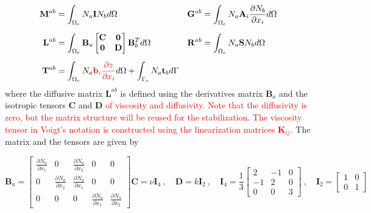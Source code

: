 \documentclass[a4paper,12pt]{elsarticle}
\newcommand{\Miguel}[1]{\textcolor{red}{#1}}
\newcommand{\pder}[2]{\frac{\partial#1}{\partial#2}}
\begin{document}
\begin{align} \label{discrete_sw_matrices}
    \displaystyle \mathbf{M}^{ab} &= \int_{\Omega_e}N_a \mathbf{I} N_b d\Omega &
    \displaystyle \mathbf{G}^{ab} &= \int_{\Omega_e}
        N_a \mathbf{A}_i \pder{N_b}{x_i} d\Omega \nonumber\\[5pt]
    \displaystyle \mathbf{L}^{ab} &= \int_{\Omega_e}
        \mathbf{B}_a \left[\begin{matrix}
            \mathbf{C} & \mathbf{0} \\ \mathbf{0} & \mathbf{D}
        \end{matrix}\right] \mathbf{B}_b^T d\Omega &
    \displaystyle \mathbf{R}^{ab} &= \int_{\Omega_e} N_a \mathbf{S} N_b d\Omega \\[5pt]
    \displaystyle \mathbf{T}^{ab} &= \int_{\Omega_e} N_a \Miguel{\mathbf{b}_i \pder{z}{x_i}} d\Omega +
        \int_{\Gamma_e} N_a \mathbf{t}_b d\Gamma \nonumber
\end{align}
where the diffusive matrix $\mathbf{L}^{ab}$ is defined using the derivatives matrix $\mathbf{B}_a$ and the isotropic tensors $\mathbf{C}$ and $\mathbf{D}$ \Miguel{of viscosity and diffusivity. Note that the diffusivity is zero, but the matrix structure will be reused for the stabilization. The viscosity tensor in Voigt's notation is constructed using the linearization matrices $\mathbf{K}_{ij}$.}
The matrix and the tensors are given by

\begin{subequations}
\begin{equation}
\mathbf{B}_a = \left[\begin{matrix}
    \pder{N_a}{x_1} & 0 & \pder{N_a}{x_2} & 0 & 0 \\
    0 & \pder{N_a}{x_2} & \pder{N_a}{x_1} & 0 & 0 \\
    0 & 0 & 0 & \pder{N_a}{x_1} & \pder{N_a}{x_2}
\end{matrix}\right]
\end{equation}
\begin{equation}
\mathbf{C} = \nu \mathbf{I}_4 \ , \quad
\mathbf{D} = k \mathbf{I}_2 \ , \quad
\mathbf{I}_4 = \frac{1}{3} \left[\begin{matrix}
        2 & -1 & 0 \\
        -1 & 2 & 0 \\
        0 & 0 & 3
    \end{matrix}\right] \ , \quad
\mathbf{I}_2 = \left[\begin{matrix}
        1 & 0 \\
        0 & 1
    \end{matrix}\right]
\end{equation}
\end{subequations}
\end{document}
